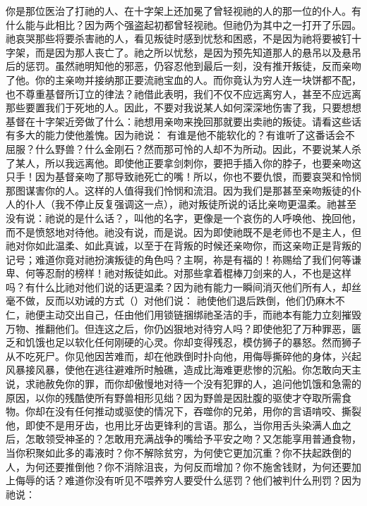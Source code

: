你是那位医治了打祂的人、在十字架上还加冕了曾轻视祂的人的那一位的仆人。有什么能与此相比？因为两个强盗起初都曾轻视祂。但祂仍为其中之一打开了乐园。祂哀哭那些将要杀害祂的人，看见叛徒时感到忧愁和困惑，不是因为祂将要被钉十字架，而是因为那人丧亡了。祂之所以忧愁，是因为预先知道那人的悬吊以及悬吊后的惩罚。虽然祂明知他的邪恶，仍容忍他到最后一刻，没有推开叛徒，反而亲吻了他。你的主亲吻并接纳那正要流祂宝血的人。而你竟认为穷人连一块饼都不配，也不尊重基督所订立的律法？祂借此表明，我们不仅不应远离穷人，甚至不应远离那些要置我们于死地的人。因此，不要对我说某人如何深深地伤害了我，只要想想基督在十字架近旁做了什么：祂想用亲吻来挽回那就要出卖祂的叛徒。请看这些话有多大的能力使他羞愧。因为祂说： 有谁是他不能软化的？有谁听了这番话会不屈服？什么野兽？什么金刚石？然而那可怜的人却不为所动。因此，不要说某人杀了某人，所以我远离他。即使他正要拿剑刺你，要把手插入你的脖子，也要亲吻这只手！因为基督亲吻了那导致祂死亡的嘴！所以，你也不要仇恨，而要哀哭和怜悯那图谋害你的人。这样的人值得我们怜悯和流泪。因为我们是那甚至亲吻叛徒的仆人的仆人（我不停止反复强调这一点），祂对叛徒所说的话比亲吻更温柔。祂甚至没有说：祂说的是什么话？，叫他的名字，更像是一个哀伤的人呼唤他、挽回他，而不是愤怒地对待他。祂没有说，而是说。因为即使祂既不是老师也不是主人，但祂对你如此温柔、如此真诚，以至于在背叛的时候还亲吻你，而这亲吻正是背叛的记号；难道你竟对祂扮演叛徒的角色吗？主啊，祢是有福的！祢赐给了我们何等谦卑、何等忍耐的榜样！祂对叛徒如此。对那些拿着棍棒刀剑来的人，不也是这样吗？有什么比祂对他们说的话更温柔？因为祂有能力一瞬间消灭他们所有人，却丝毫不做，反而以劝诫的方式（）对他们说： 祂使他们退后跌倒，他们仍麻木不仁，祂便主动交出自己，任由他们用锁链捆绑祂圣洁的手，而祂本有能力立刻摧毁万物、推翻他们。但连这之后，你仍凶狠地对待穷人吗？即使他犯了万种罪恶，匮乏和饥饿也足以软化任何刚硬的心灵。你却变得残忍，模仿狮子的暴怒。然而狮子从不吃死尸。你见他因苦难而，却在他跌倒时扑向他，用侮辱撕碎他的身体，兴起风暴接风暴，使他在逃往避难所时触礁，造成比海难更悲惨的沉船。你怎敢向天主说，求祂赦免你的罪，而你却傲慢地对待一个没有犯罪的人，追问他饥饿和急需的原因，以你的残酷使所有野兽相形见绌？因为野兽是因肚腹的驱使才夺取所需食物。你却在没有任何推动或驱使的情况下，吞噬你的兄弟，用你的言语啃咬、撕裂他，即使不是用牙齿，也用比牙齿更锋利的言语。那么，当你用舌头染满人血之后，怎敢领受神圣的？怎敢用充满战争的嘴给予平安之吻？又怎能享用普通食物，当你积聚如此多的毒液时？你不解除贫穷，为何使它更加沉重？你不扶起跌倒的人，为何还要推倒他？你不消除沮丧，为何反而增加？你不施舍钱财，为何还要加上侮辱的话？难道你没有听见不喂养穷人要受什么惩罚？他们被判什么刑罚？因为祂说： 
